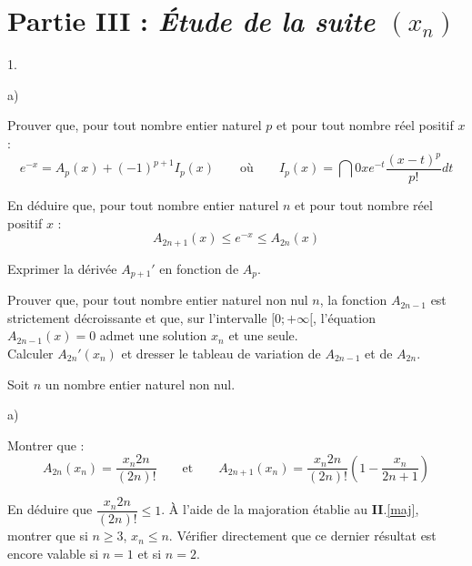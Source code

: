 \documentclass[11pt]{article}%
\begin{document}
\section*{Partie III : \emph{Étude de la suite $(x_{n})$}}

\begin{noliste}{1.}
 \setlength{\itemsep}{4mm}
\item 

\begin{noliste}{a)}
 \setlength{\itemsep}{2mm}
\item Prouver que, pour tout nombre entier naturel $p$ et pour tout
nombre réel positif $x$ : 
\[
e^{-x} = A_{p}(x) + (-1)^{p + 1}I_{p}(x)\qquad \text{où}\qquad
I_{p}(x) = \dint{0}{x}e^{-t}\dfrac{(x-t)^{p}}{p!}dt
\]

\item En déduire que, pour tout nombre entier naturel $n$ et pour tout
nombre réel positif $x$ : 
\begin{equation}
A_{2n + 1}(x)\leq e^{-x}\leq A_{2n}(x) \label{exp(-x)}
\end{equation}

\item Exprimer la dérivée $A_{p + 1}{\prime }$ en fonction de $A_{p}$.

\item Prouver que, pour tout nombre entier naturel non nul $n$, la
fonction $A_{2n-1}$ est strictement décroissante et que, sur
l'intervalle $[0; + \infty
\lbrack $, l'équation $A_{2n-1}(x) = 0$ admet une solution $x_{n}$ et
une
seule.\\
Calculer $A_{2n}{\prime }(x_{n})$ et dresser le tableau de variation de
$A_{2n-1}$ et de $A_{2n}$.
\end{noliste}

\item Soit $n$ un nombre entier naturel non nul.

\begin{noliste}{a)}
 \setlength{\itemsep}{2mm}
\item Montrer que : 
\[
A_{2n}(x_{n}) = \dfrac{x_{n}{2n}}{(2n)!}\qquad \text{et}\qquad
A_{2n + 1}(x_{n}) = \dfrac{x_{n}{2n}}{(2n)!}\left( 1-\dfrac{x_{n}}{2n +
1}\right)
\]

\item En déduire que $\dfrac{x_{n}{2n}}{(2n)!}\leq 1$. À l'aide de la
majoration établie au \textbf{II}.\ref{maj}, montrer que si $n\geq 3$,
$x_{n}\leq n$. Vérifier directement que ce dernier résultat est encore
valable si $n = 1$ et si $n = 2$.


\end{noliste}
\end{noliste}
\end{document}
